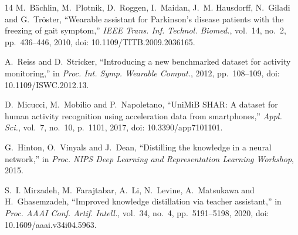 \documentclass[conference,twocolumn]{IEEEtran}
\begin{document}
{\begin{thebibliography}{14}
M.~B\"{a}chlin, M.~Plotnik, D.~Roggen, I.~Maidan, J.~M. Hausdorff, N.~Giladi and G.~Tr\"{o}ster, ``Wearable assistant for Parkinson's disease patients with the freezing of gait symptom,'' \textit{IEEE Trans. Inf. Technol. Biomed.}, vol.~14, no.~2, pp.~436--446, 2010, doi: 10.1109/TITB.2009.2036165.

A.~Reiss and D.~Stricker, ``Introducing a new benchmarked dataset for activity monitoring,'' in \textit{Proc. Int. Symp. Wearable Comput.}, 2012, pp.~108--109, doi: 10.1109/ISWC.2012.13.

D.~Micucci, M.~Mobilio and P.~Napoletano, ``UniMiB SHAR: A dataset for human activity recognition using acceleration data from smartphones,'' \textit{Appl. Sci.}, vol.~7, no.~10, p.~1101, 2017, doi: 10.3390/app7101101.

G.~Hinton, O.~Vinyals and J.~Dean, ``Distilling the knowledge in a neural network,'' in \textit{Proc. NIPS Deep Learning and Representation Learning Workshop}, 2015.

S.~I. Mirzadeh, M.~Farajtabar, A.~Li, N.~Levine, A.~Matsukawa and H.~Ghasemzadeh, ``Improved knowledge distillation via teacher assistant,'' in \textit{Proc. AAAI Conf. Artif. Intell.}, vol.~34, no.~4, pp.~5191--5198, 2020, doi: 10.1609/aaai.v34i04.5963.

\end{thebibliography}
}
\end{document}
